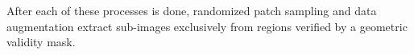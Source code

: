 \documentclass{article}
\begin{document}
%

After each of these processes is done, randomized patch sampling and data augmentation extract sub-images exclusively from regions verified by a geometric validity mask.
\end{document}
